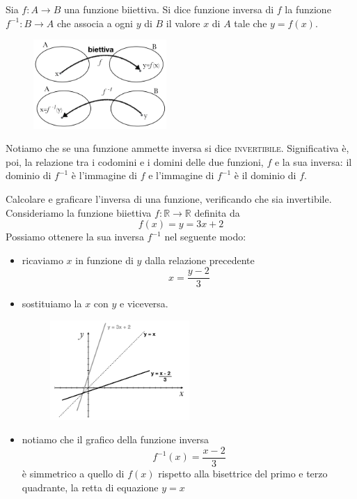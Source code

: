 \begin{definizione}
Sia \(f : A\to B\) una funzione biiettiva. Si dice funzione inversa di \(f\) la 
funzione \(f^{-1} : B\to A\) che associa a ogni \(y\) di \(B\) il valore \(x\) di \(A\) 
tale che \(y=f(x)\).
\end{definizione}

\begin{figure}[htpb!]
  \centering
  \includegraphics[width=0.45\textwidth]{img/funz_12.png} 
\end{figure}

Notiamo che se una funzione ammette inversa si dice \textsc{invertibile}. 
Significativa è, poi, la relazione tra i codomini e i domini delle due 
funzioni, \(f\) e la sua inversa: il dominio di \(f^{-1}\) è l'immagine di \(f\) e 
l'immagine di \(f^{-1}\) è il dominio di \(f\).\\

\begin{esempio} Calcolare  e graficare l'inversa di una funzione, verificando 
che sia invertibile.\\ 
Consideriamo la funzione biiettiva \(f:\mathbb{R}\to\mathbb{R}\) definita da
\[f(x)=y=3x+2\]
Possiamo ottenere la sua inversa \(f^{-1}\) nel seguente modo:
  \begin{itemize}
  \item ricaviamo \(x\) in funzione di \(y\) dalla relazione 
precedente
\[x=\frac{y-2}{3}\]
  \item sostituiamo la \(x\) con \(y\) e viceversa.
  \begin{figure}[htpb!]
  \centering
  
\includegraphics[width=0.5\textwidth]{img/funz_13.png} 
  \end{figure}
  \item notiamo che il grafico della funzione inversa
\[f^{-1}(x)=\frac{x-2}{3}\]
è simmetrico a quello di \(f(x)\) rispetto alla bisettrice del primo e terzo 
quadrante, la retta di equazione \(y=x\)
  \end{itemize}
\end{esempio}

